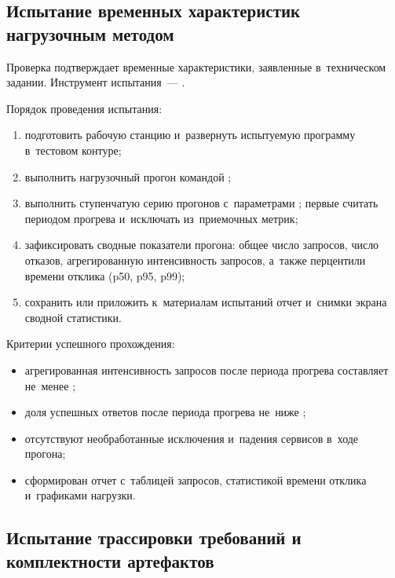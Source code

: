 \documentclass[12pt,a4paper]{extarticle}
\begin{document}
\subsection{Испытание временных характеристик нагрузочным методом}

\begin{hseExample}
Проверка подтверждает временные характеристики, заявленные в~техническом задании. Инструмент испытания~--- .

Порядок проведения испытания:
\begin{enumerate}[label=\arabic*), leftmargin=1.25cm]
    \item подготовить рабочую станцию и~развернуть испытуемую программу в~тестовом контуре;
    \item выполнить нагрузочный прогон командой ;
    \item выполнить ступенчатую серию прогонов с~параметрами ; первые  считать периодом прогрева и~исключать из~приемочных метрик;
    \item зафиксировать сводные показатели прогона: общее число запросов, число отказов, агрегированную интенсивность запросов, а~также перцентили времени отклика (p50, p95, p99);
    \item сохранить или приложить к~материалам испытаний отчет и~снимки экрана сводной статистики.
\end{enumerate}

Критерии успешного прохождения:
\begin{itemize}[nosep, leftmargin=1.25cm]
    \item агрегированная интенсивность запросов после периода прогрева составляет не~менее ;
    \item доля успешных ответов после периода прогрева не~ниже ;
    \item отсутствуют необработанные исключения и~падения сервисов в~ходе прогона;
    \item сформирован отчет с~таблицей запросов, статистикой времени отклика и~графиками нагрузки.
\end{itemize}
\end{hseExample}

\subsection{Испытание трассировки требований и комплектности артефактов}
\end{document}
